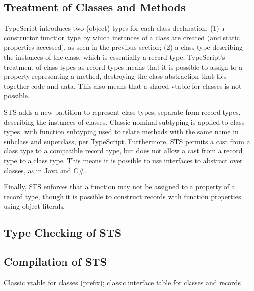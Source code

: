 \subsection{Treatment of Classes and Methods}

TypeScript introduces two (object) types for each class declaration: 
(1) a constructor function type by which instances of a class
are created (and static properties accessed), as seen in the previous section; 
(2) a class type describing the instances of the class, which is essentially a record type. 
TypeScript's treatment of class types as record types
means that it is possible to assign to a property representing a method, 
destroying the class abstraction that ties together code and data. This also means
that a shared vtable for classes is not possible. 

STS adds a new partition to represent class types, separate from record types, describing the instances of classes.
Classic nominal subtyping is applied to class types, with function subtyping used to relate methods with 
the same name in subclass and superclass, per TypeScript. 
Furthermore, STS permits a cast from a class type
to a compatible record type, but does not allow a cast from a record type to a class type. This means
it is possible to use interfaces to abstract over classes, as in Java and C\#. 

Finally, STS enforces that a function may not
be assigned to a property of a record type, 
though it is possible to construct records with function properties using object literals. 

\subsection{Type Checking of STS}




\subsection{Compilation of STS}


Classic vtable for classes (prefix); classic interface table for classes and records
